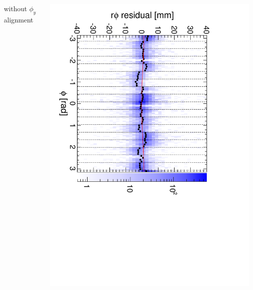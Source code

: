 \documentclass[compress]{beamer}
\begin{document}
\begin{frame}
\begin{columns}
\centering without $\phi_y$ alignment

\includegraphics[height=\linewidth, angle=90]{diskiter02_phiyzero_m3to4.pdf}
\end{columns}
\end{frame}
\end{document}
